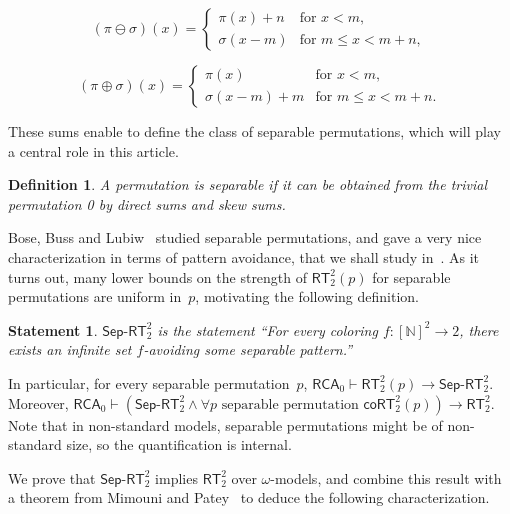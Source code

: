 \documentclass{article}
\numberwithin{theorem}{section}
\newtheorem{definition}[theorem]{Definition}
\newtheorem{statement}[theorem]{Statement}
\newcommand{\quentin}[1]{\textcolor{green}{#1}}
\newcommand{\RCA}[0]{\mathsf{RCA}}
\newcommand{\RT}[0]{\mathsf{RT}}
\newcommand{\coRT}[0]{\mathsf{coRT}}
\newcommand{\SepRT}[0]{\mathsf{Sep}\mbox{-}\mathsf{RT}}
\newcommand{\NN}[0]{\mathbb{N}}
\def\qt#1{``#1''}%
\def\qt#1{``#1''}%
\begin{document}
$$(\pi\ominus\sigma)(x) = \begin{cases} \pi(x)+n & \text{for }x < m, \\
\sigma(x-m) & \text{for }m\le x < m+n,\end{cases}
$$

$$(\pi\oplus\sigma)(x) = \begin{cases} \pi(x) & \text{for }x < m,\\
\sigma(x-m)+m & \text{for }m \le x < m+n.\end{cases}
$$

These sums enable to define the class of separable permutations, which will play a central role in this article.

\begin{definition}
    A permutation is \emph{separable} if it can be obtained from the trivial permutation 0 by direct sums and skew sums.
\end{definition}

Bose, Buss and Lubiw~\cite{bose1998pattern} studied separable permutations, and gave a very nice characterization in terms of pattern avoidance, that we shall study in~.
As it turns out, many lower bounds on the strength of $\RT^2_2(p)$ for separable permutations are uniform in~$p$, motivating the following definition.

\begin{statement}
$\SepRT^2_2$ is the statement \qt{For every coloring $f : [\NN]^2 \to 2$, there exists an infinite set $f$-avoiding some separable pattern.}
\end{statement}

In particular, for every separable permutation~$p$, $\RCA_0 \vdash \RT^2_2(p) \to \SepRT^2_2$. Moreover, 
$\RCA_0 \vdash (\SepRT^2_2 \wedge \forall p \mbox{ separable permutation } \coRT^2_2(p)) \to \RT^2_2$.
Note that in non-standard models, separable permutations might be of non-standard size, so the quantification is internal. %

We prove that $\SepRT^2_2$ implies $\RT^2_2$ over $\omega$-models, and combine this result with a theorem from Mimouni and Patey~\cite{mimouni2025ramseylike} to deduce the following characterization.
\end{document}
